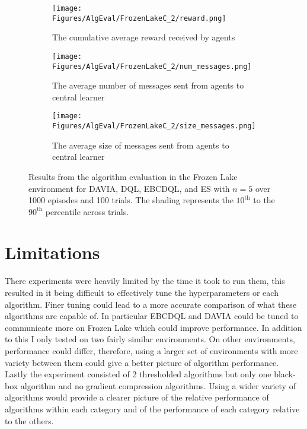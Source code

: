 \begin{figure}[H]
    \centering
    \begin{subfigure}{0.5\textwidth}
        \centering
        \texttt{[image: Figures/AlgEval/FrozenLakeC\_2/reward.png]}
        \caption{The cumulative average reward received by agents}
        \label{fig:EvalFLReward}
    \end{subfigure}
    \begin{subfigure}{0.5\textwidth}
        \centering
        \texttt{[image: Figures/AlgEval/FrozenLakeC\_2/num\_messages.png]}
        \caption{The average number of messages sent from agents to central learner}
        \label{fig:EvalFLNumMessages}
    \end{subfigure}
    \begin{subfigure}{0.5\textwidth}
        \centering
        \texttt{[image: Figures/AlgEval/FrozenLakeC\_2/size\_messages.png]}
        \caption{The average size of messages sent from agents to central learner}
        \label{fig:EvalFLSizeMessages}
    \end{subfigure}
    \caption{Results from the algorithm evaluation in the Frozen Lake environment for DAVIA, DQL, EBCDQL, and ES with $n=5$ over 1000 episodes and 100 trials. The shading represents the $10^\text{th}$ to the $90^{\text{th}}$ percentile across trials.}
    \label{fig:EvalFL}
\end{figure}

\section{Limitations}
There experiments were heavily limited by the time it took to run them, this resulted in it being difficult to effectively tune the hyperparameters or each algorithm. Finer tuning could lead to a more accurate comparison of what these algorithms are capable of. In particular EBCDQL and DAVIA could be tuned to communicate more on Frozen Lake which could improve performance.
In addition to this I only tested on two fairly similar environments. On other environments, performance could differ, therefore, using a larger set of environments with more variety between them could give a better picture of algorithm performance. Lastly the experiment consisted of 2 thresholded algorithms but only one black-box algorithm and no gradient compression algorithms. Using a wider variety of algorithms would provide a clearer picture of the relative performance of algorithms within each category and of the performance of each category relative to the others.

